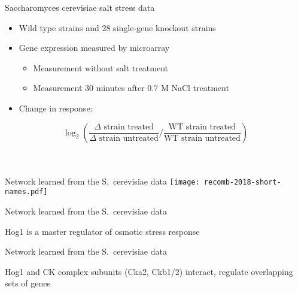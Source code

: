 \documentclass[aspectratio=169]{beamer}
\begin{document}

\begin{frame}{Saccharomyces cerevisiae salt stress data}
\begin{itemize}
 \item Wild type strains and 28 single-gene knockout strains
 \item Gene expression measured by microarray
  \begin{itemize}
   \item \normalsize Measurement without salt treatment
   \item \normalsize Measurement 30 minutes after 0.7 M NaCl treatment
  \end{itemize}
 \item Change in response:
\end{itemize}
\[
 \log_2 \left( \frac{\Delta \text{ strain treated}}{\Delta \text{ strain untreated}} \bigg/ \frac{\text{WT strain treated}}{\text{WT strain untreated}} \right)
\]
\vfill
{\tiny {} \\  \\}
\end{frame}


\begin{frame}{}\small  
\end{frame}


\begin{frame}{Network learned from the S.\ cerevisiae data}
\texttt{[image: recomb-2018-short-names.pdf]}
\end{frame}


\begin{frame}{Network learned from the S.\ cerevisiae data}

\vfill

Hog1 is a master regulator of osmotic stress response
\end{frame}


\begin{frame}{Network learned from the S.\ cerevisiae data}

\vfill

Hog1 and CK complex subunits (Cka2, Ckb1/2) interact, regulate overlapping sets of genes
\end{frame}
\end{document}
